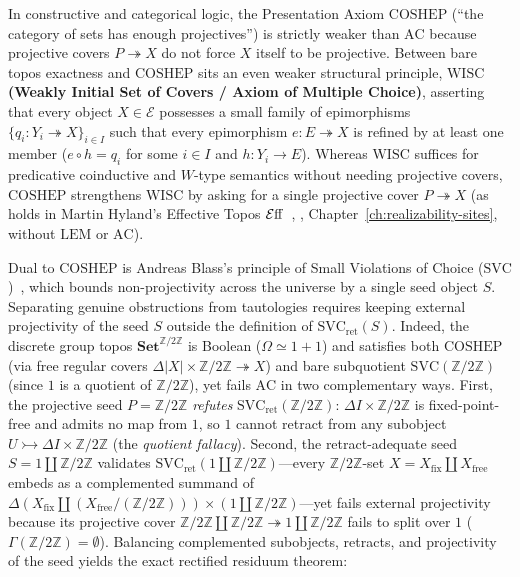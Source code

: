 In constructive and categorical logic, the Presentation Axiom $\mathrm{COSHEP}$ (``the category of sets has enough projectives'') is strictly weaker than $\mathrm{AC}$ because projective covers $P \twoheadrightarrow X$ do not force $X$ itself to be projective. Between bare topos exactness and $\mathrm{COSHEP}$ sits an even weaker structural principle, \textbf{$\mathrm{WISC}$ (Weakly Initial Set of Covers / Axiom of Multiple Choice)}, asserting that every object $X \in \mathcal{E}$ possesses a small family of epimorphisms $\{q_i : Y_i \twoheadrightarrow X\}_{i \in I}$ such that every epimorphism $e : E \twoheadrightarrow X$ is refined by at least one member ($e \circ h = q_i$ for some $i \in I$ and $h : Y_i \to E$). Whereas $\mathrm{WISC}$ suffices for predicative coinductive and $W$-type semantics without needing projective covers, $\mathrm{COSHEP}$ strengthens $\mathrm{WISC}$ by asking for a single projective cover $P \twoheadrightarrow X$ (as holds in Martin Hyland's Effective Topos $\mathcal{E}\mathrm{ff}$~\cite{Hyland82}, \cite[\S\S 3.1--3.2]{vanOosten08}, Chapter~\ref{ch:realizability-sites}, without $\mathrm{LEM}$ or $\mathrm{AC}$).

Dual to $\mathrm{COSHEP}$ is Andreas Blass's principle of Small Violations of Choice ($\mathrm{SVC}$)~\cite{Blass79}, which bounds non-projectivity across the universe by a single seed object $S$. Separating genuine obstructions from tautologies requires keeping external projectivity of the seed $S$ outside the definition of $\mathrm{SVC}_{\mathrm{ret}}(S)$. Indeed, the discrete group topos $\mathbf{Set}^{\mathbb{Z}/2\mathbb{Z}}$ is Boolean ($\Omega \simeq 1+1$) and satisfies both $\mathrm{COSHEP}$ (via free regular covers $\Delta|X| \times \mathbb{Z}/2\mathbb{Z} \twoheadrightarrow X$) and bare subquotient $\mathrm{SVC}(\mathbb{Z}/2\mathbb{Z})$ (since $1$ is a quotient of $\mathbb{Z}/2\mathbb{Z}$), yet fails $\mathrm{AC}$ in two complementary ways. First, the projective seed $P = \mathbb{Z}/2\mathbb{Z}$ \emph{refutes} $\mathrm{SVC}_{\mathrm{ret}}(\mathbb{Z}/2\mathbb{Z})$: $\Delta I \times \mathbb{Z}/2\mathbb{Z}$ is fixed-point-free and admits no map from $1$, so $1$ cannot retract from any subobject $U \rightarrowtail \Delta I \times \mathbb{Z}/2\mathbb{Z}$ (the \emph{quotient fallacy}). Second, the retract-adequate seed $S = 1 \amalg \mathbb{Z}/2\mathbb{Z}$ validates $\mathrm{SVC}_{\mathrm{ret}}(1 \amalg \mathbb{Z}/2\mathbb{Z})$---every $\mathbb{Z}/2\mathbb{Z}$-set $X = X_{\mathrm{fix}} \amalg X_{\mathrm{free}}$ embeds as a complemented summand of $\Delta(X_{\mathrm{fix}} \amalg (X_{\mathrm{free}}/\!(\mathbb{Z}/2\mathbb{Z}))) \times (1 \amalg \mathbb{Z}/2\mathbb{Z})$---yet fails external projectivity because its projective cover $\mathbb{Z}/2\mathbb{Z} \amalg \mathbb{Z}/2\mathbb{Z} \twoheadrightarrow 1 \amalg \mathbb{Z}/2\mathbb{Z}$ fails to split over $1$ ($\Gamma(\mathbb{Z}/2\mathbb{Z}) = \emptyset$). Balancing complemented subobjects, retracts, and projectivity of the seed yields the exact rectified residuum theorem:

